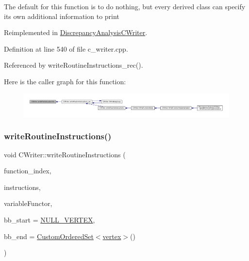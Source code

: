 The default for this function is to do nothing, but every derived class can specify its own additional information to print 

Reimplemented in \hyperlink{classDiscrepancyAnalysisCWriter_a891686ef683dad2ed3b99d071f3fb69a}{Discrepancy\+Analysis\+C\+Writer}.



Definition at line 540 of file c\+\_\+writer.\+cpp.



Referenced by write\+Routine\+Instructions\+\_\+rec().

Here is the caller graph for this function\+:
\nopagebreak
\begin{figure}[H]
\begin{center}
\leavevmode
\includegraphics[width=350pt]{d3/d59/classCWriter_a89fcc230d50a8b5087a08348b67b470a_icgraph}
\end{center}
\end{figure}
\mbox{\label{classCWriter_a7810dd571d72debb400b889f8366848a}} 
\subsubsection{\texorpdfstring{write\+Routine\+Instructions()}{writeRoutineInstructions()}}
{\footnotesize\ttfamily void C\+Writer\+::write\+Routine\+Instructions (\begin{DoxyParamCaption}\item[{const unsigned int}]{function\+\_\+index,  }\item[{const \hyperlink{classOpVertexSet}{Op\+Vertex\+Set} \&}]{instructions,  }\item[{\hyperlink{var__pp__functor_8hpp_a8a6b51b6519401d911398943510557f0}{var\+\_\+pp\+\_\+functor\+Const\+Ref}}]{variable\+Functor,  }\item[{\hyperlink{graph_8hpp_abefdcf0544e601805af44eca032cca14}{vertex}}]{bb\+\_\+start = {\ttfamily \hyperlink{graph_8hpp_ac3c33c45c396860b76e8aff4dd2b8158}{N\+U\+L\+L\+\_\+\+V\+E\+R\+T\+EX}},  }\item[{\hyperlink{classCustomOrderedSet}{Custom\+Ordered\+Set}$<$ \hyperlink{graph_8hpp_abefdcf0544e601805af44eca032cca14}{vertex} $>$}]{bb\+\_\+end = {\ttfamily \hyperlink{classCustomOrderedSet}{Custom\+Ordered\+Set}$<$\hyperlink{graph_8hpp_abefdcf0544e601805af44eca032cca14}{vertex}$>$()} }\end{DoxyParamCaption})\hspace{0.3cm}{\ttfamily [virtual]}}




